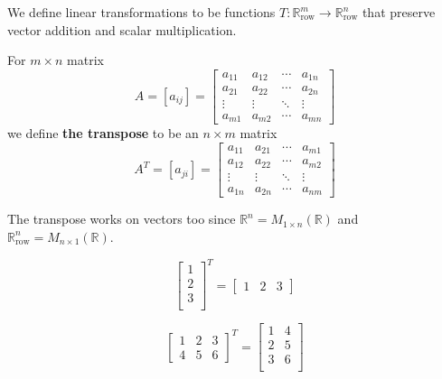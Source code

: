 We define linear transformations to be functions $T:\mathbb{R}^m_\text{row} \to \mathbb{R}^n_\text{row}$ that preserve vector addition and scalar multiplication. 

\begin{definition}
For $m \times n$ matrix $$A=[a_{ij}]=
\begin{bmatrix}
a_{11} & a_{12} & \cdots & a_{1n} \\
a_{21} & a_{22} & \cdots & a_{2n} \\
\vdots & \vdots & \ddots & \vdots \\
a_{m1} & a_{m2} & \cdots & a_{mn} 
\end{bmatrix}
$$ 
we define \textbf{the transpose} to be an $n \times m$ matrix  
$$A^T=[a_{ji}]=
\begin{bmatrix}
a_{11} & a_{21} & \cdots & a_{m1} \\
a_{12} & a_{22} & \cdots & a_{m2} \\
\vdots & \vdots & \ddots & \vdots \\
a_{1n} & a_{2n} & \cdots & a_{nm} 
\end{bmatrix}$$ 
\end{definition}

\begin{remark}
The transpose works on vectors too since $\mathbb{R}^n=M_{1 \times n}(\mathbb{R})$ and $\mathbb{R}^n_\text{row}=M_{n \times 1}(\mathbb{R})$. 
\end{remark}

\begin{example}
\[
\begin{bmatrix}
1 \\
2 \\
3 \\
\end{bmatrix}^T
=\begin{bmatrix}
1 & 2 & 3
\end{bmatrix}
\]
\end{example}

\begin{example}
\[
\begin{bmatrix}
1 & 2 & 3 \\
4 & 5 & 6 
\end{bmatrix}^T
=\begin{bmatrix}
1 & 4 \\
2 & 5 \\
3 & 6 \\
\end{bmatrix}
\]
\end{example}

